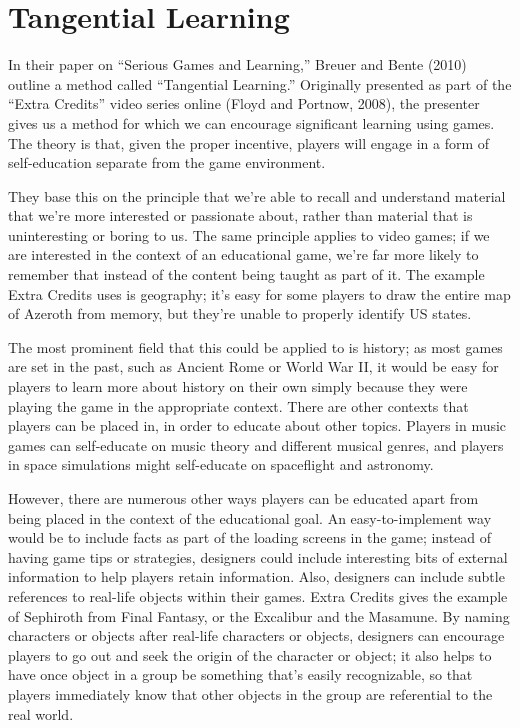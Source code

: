 \documentclass[12pt]{report}
\begin{document}
			

	\section{Tangential Learning}

		In their paper on “Serious Games and Learning,” Breuer and Bente (2010) outline a method called “Tangential Learning.” Originally presented as part of the “Extra Credits” video series online (Floyd and Portnow, 2008), the presenter gives us a method for which we can encourage significant learning using games. The theory is that, given the proper incentive, players will engage in a form of self-education separate from the game environment.
		
		They base this on the principle that we're able to recall and understand material that we're more interested or passionate about, rather than material that is uninteresting or boring to us. The same principle applies to video games; if we are interested in the context of an educational game, we're far more likely to remember that instead of the content being taught as part of it. The example Extra Credits uses is geography; it's easy for some players to draw the entire map of Azeroth from memory, but they're unable to properly identify US states.
		
		The most prominent field that this could be applied to is history; as most games are set in the past, such as Ancient Rome or World War II, it would be easy for players to learn more about history on their own simply because they were playing the game in the appropriate context. There are other contexts that players can be placed in, in order to educate about other topics. Players in music games can self-educate on music theory and different musical genres, and players in space simulations might self-educate on spaceflight and astronomy. 
		
		However, there are numerous other ways players can be educated apart from being placed in the context of the educational goal. An easy-to-implement way would be to include facts as part of the loading screens in the game; instead of having game tips or strategies, designers could include interesting bits of external information to help players retain information. Also, designers can include subtle references to real-life objects within their games. Extra Credits gives the example of Sephiroth from Final Fantasy, or the Excalibur and the Masamune. By naming characters or objects after real-life characters or objects, designers can encourage players to go out and seek the origin of the character or object; it also helps to have once object in a group be something that's easily recognizable, so that players immediately know that other objects in the group are referential to the real world.
		
\end{document}
